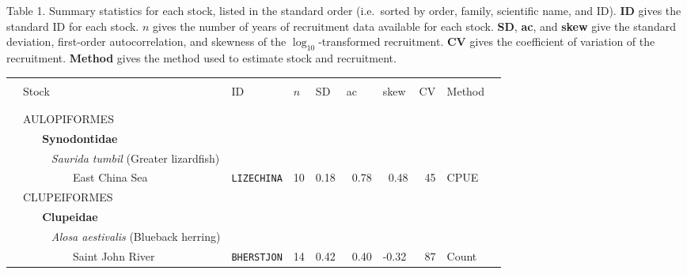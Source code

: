 \baselineskip 
\topmargin -0.5in
\oddsidemargin -0.3in
\textwidth 7.1in
\textheight 12in
\pagestyle{empty} 
\setcounter{page}{1}
 
\par 
\footnotesize
\begin{flushleft}

\renewcommand{\baselinestretch}{1.2} 
 
\parbox{7.1in}{\normalsize {\large \sc Table 1.} 
Summary statistics for each stock, listed in the standard order 
(i.e.\ sorted by order, family, scientific name, and ID). 
{\bf ID} gives the standard ID for each stock. 
{\boldmath $n$} gives the number of years of recruitment data 
available for each stock. 
{\bf SD}, {\bf ac}, and {\bf skew} give the standard deviation, first-order 
autocorrelation, and skewness of the $\log_{10}$-transformed recruitment. 
{\bf CV} gives the coefficient of variation of the recruitment. 
{\bf Method} gives the method used to estimate stock and recruitment.} 
\vspace{0.1in} 
\rm 
 \renewcommand{\baselinestretch}{1} 
 \footnotesize 
\begin{tabular*}{7.1in}{llllllllll} 
\hline &&&&&&&&&\\ 
&{\normalsize Stock}&{\normalsize ID}&{\normalsize $n$}&{\normalsize SD}&{\normalsize ac}&{\normalsize skew}&{\normalsize CV}&{\normalsize Method}  & \\ 
 &&&&&&&&&\\ 
  \hline  &&&&&&&&&\\ 
&{\normalsize AULOPIFORMES}&~&~&~&~&~&~&~  & \\ 
&{\bf~~~Synodontidae}&~&~&~&~&~&~&~  & \\ 
&{\it~~~~~Saurida tumbil} (Greater lizardfish)&~&~&~&~&~&~&~  & \\ 
&~~~~~~~~~East China Sea&{\tt LIZECHINA}&10&0.18&~0.78&~0.48&~45&CPUE  & \\ 
&{\normalsize CLUPEIFORMES}&~&~&~&~&~&~&~  & \\ 
&{\bf~~~Clupeidae}&~&~&~&~&~&~&~  & \\ 
&{\it~~~~~Alosa aestivalis} (Blueback herring)&~&~&~&~&~&~&~  & \\ 
&~~~~~~~~~Saint John River&{\tt BHERSTJON}&14&0.42&~0.40&-0.32&~87&Count  & \\ 

\end{tabular*}
\end{flushleft}
